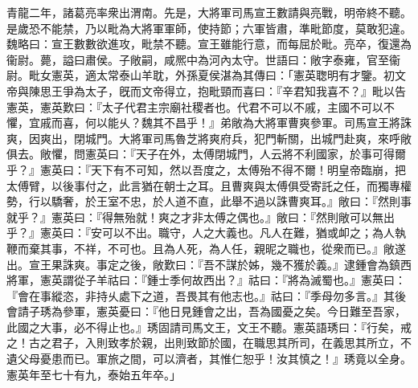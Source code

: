 \begin{pinyinscope}
青龍二年，諸葛亮率衆出渭南。先是，大將軍司馬宣王數請與亮戰，明帝終不聽。是歲恐不能禁，乃以毗為大將軍軍師，使持節；六軍皆肅，準毗節度，莫敢犯違。魏略曰：宣王數數欲進攻，毗禁不聽。宣王雖能行意，而每屈於毗。亮卒，復還為衞尉。薨，謚曰肅侯。子敞嗣，咸熈中為河內太守。世語曰：敞字泰雍，官至衞尉。毗女憲英，適太常泰山羊耽，外孫夏侯湛為其傳曰：「憲英聦明有才鑒。初文帝與陳思王爭為太子，旣而文帝得立，抱毗頸而喜曰：『辛君知我喜不？』毗以告憲英，憲英歎曰：『太子代君主宗廟社稷者也。代君不可以不戚，主國不可以不懼，宜戚而喜，何以能乆？魏其不昌乎！』弟敞為大將軍曹爽參軍。司馬宣王將誅爽，因爽出，閉城門。大將軍司馬魯芝將爽府兵，犯門斬關，出城門赴爽，來呼敞俱去。敞懼，問憲英曰：『天子在外，太傅閉城門，人云將不利國家，於事可得爾乎？』憲英曰：『天下有不可知，然以吾度之，太傅殆不得不爾！明皇帝臨崩，把太傅臂，以後事付之，此言猶在朝士之耳。且曹爽與太傅俱受寄託之任，而獨專權勢，行以驕奢，於王室不忠，於人道不直，此舉不過以誅曹爽耳。』敞曰：『然則事就乎？』憲英曰：『得無殆就！爽之才非太傅之偶也。』敞曰：『然則敞可以無出乎？』憲英曰：『安可以不出。職守，人之大義也。凡人在難，猶或卹之；為人執鞭而棄其事，不祥，不可也。且為人死，為人任，親昵之職也，從衆而已。』敞遂出。宣王果誅爽。事定之後，敞歎曰：『吾不謀於姊，幾不獲於義。』逮鍾會為鎮西將軍，憲英謂從子羊祜曰：『鍾士季何故西出？』祜曰：『將為滅蜀也。』憲英曰：『會在事縱恣，非持乆處下之道，吾畏其有他志也。』祜曰：『季母勿多言。』其後會請子琇為參軍，憲英憂曰：『他日見鍾會之出，吾為國憂之矣。今日難至吾家，此國之大事，必不得止也。』琇固請司馬文王，文王不聽。憲英語琇曰：『行矣，戒之！古之君子，入則致孝於親，出則致節於國，在職思其所司，在義思其所立，不遺父母憂患而已。軍旅之間，可以濟者，其惟仁恕乎！汝其慎之！』琇竟以全身。憲英年至七十有九，泰始五年卒。」


\end{pinyinscope}